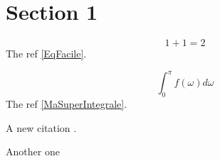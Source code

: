 \documentclass[11pt,a4paper]{article}
\begin{document}
\section{Section 1}\label{S1_intro}

\begin{equation}\label{EqFacile}
1+1=2
\end{equation}
The ref \eqref{EqFacile}.

\bigskip

\begin{equation}\label{MaSuperIntegrale}
\int_{0}^{\pi}f(\omega)d\omega
\end{equation}
The ref \eqref{MaSuperIntegrale}.

\bigskip

A new citation \cite{AlfaroFieldroad23}.

\bigskip

Another one \cite{AlfaroFujita17}

\printbibliography
\end{document}
